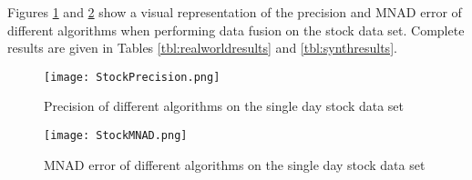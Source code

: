 \documentclass{acm_proc_article-sp}
\begin{document}
Figures \ref{fig:precision} and \ref{fig:mnad} show a visual representation of the precision and MNAD error of different algorithms when performing data fusion on the stock data set. Complete results are given in Tables \ref{tbl:realworldresults} and \ref{tbl:synthresults}.



\begin{figure}
\centering
\texttt{[image: StockPrecision.png]}
\caption{Precision of different algorithms on the single day stock data set}
\label{fig:precision}
\end{figure}


\begin{figure}
\centering
\texttt{[image: StockMNAD.png]}
\caption{MNAD error of different algorithms on the single day stock data set}
\label{fig:mnad}
\end{figure}
\end{document}
